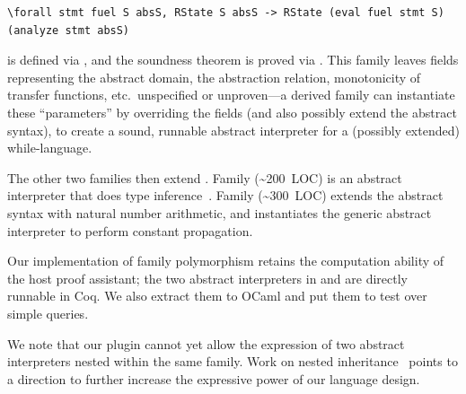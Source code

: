 \begin{centered}
\begin{minipage}{.86\textwidth}
\begin{lstlisting}[basicstyle=\fontsize{8.25}{9}\ttfamily]
\forall stmt fuel S absS, RState S absS -> RState (eval fuel stmt S) (analyze stmt absS)
\end{lstlisting}
\end{minipage}
\end{centered}

\noindent
{} is defined via , and the soundness theorem
is proved via .
This family leaves fields representing the abstract domain, the
abstraction relation, monotonicity of transfer functions, etc.\ 
unspecified or unproven---a derived family can instantiate these
``parameters'' by overriding the fields (and also possibly extend the abstract syntax),
to create a sound, runnable abstract interpreter for a (possibly extended) while-language.

The other two families then extend .
Family  (\textasciitilde200~LOC) is an abstract
interpreter that does type inference~\cite{cousot1997types}.
Family  (\textasciitilde300~LOC) extends the abstract syntax
with natural number arithmetic,
and instantiates the generic abstract interpreter to perform constant propagation.

Our implementation of family polymorphism retains the computation
ability of the host proof assistant;
the two abstract interpreters in  and  are
directly runnable in Coq.
We also extract them to OCaml and put them to test over simple queries.

We note that our plugin cannot yet allow the expression of two abstract
interpreters nested within the same family.
Work on nested inheritance~\cite{ncm2004,zm2017} points to a direction
to further increase the expressive power of our language design.

